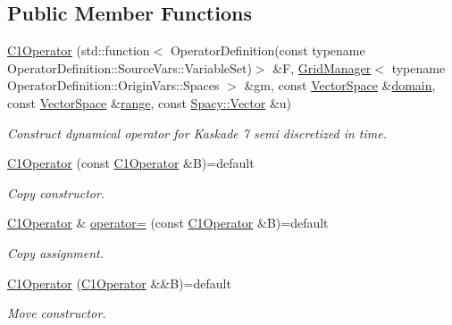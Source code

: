 \subsection*{Public Member Functions}
\begin{DoxyCompactItemize}
\item 
\hyperlink{classSpacy_1_1KaskadeParabolic_1_1C1Operator_aed6a59c7711726f83e95221c54032e98}{C1\-Operator} (std\-::function$<$ Operator\-Definition(const typename Operator\-Definition\-::\-Source\-Vars\-::\-Variable\-Set)$>$ \&F, \hyperlink{classSpacy_1_1KaskadeParabolic_1_1GridManager}{Grid\-Manager}$<$ typename Operator\-Definition\-::\-Origin\-Vars\-::\-Spaces $>$ \&gm, const \hyperlink{classSpacy_1_1VectorSpace}{Vector\-Space} \&\hyperlink{classSpacy_1_1OperatorBase_a2588f9b3e0188820c4c494e63293dc6f}{domain}, const \hyperlink{classSpacy_1_1VectorSpace}{Vector\-Space} \&\hyperlink{classSpacy_1_1OperatorBase_ab19d3b7a6f290b1079248f1e567e53d6}{range}, const \hyperlink{classSpacy_1_1Vector}{Spacy\-::\-Vector} \&u)
\begin{DoxyCompactList}\small\item\em Construct dynamical operator for Kaskade 7 semi discretized in time. \end{DoxyCompactList}\item 
\hyperlink{classSpacy_1_1KaskadeParabolic_1_1C1Operator_ab10ca63c493d51761bcb9e9dd18558d3}{C1\-Operator} (const \hyperlink{classSpacy_1_1KaskadeParabolic_1_1C1Operator}{C1\-Operator} \&B)=default
\begin{DoxyCompactList}\small\item\em Copy constructor. \end{DoxyCompactList}\item 
\hyperlink{classSpacy_1_1KaskadeParabolic_1_1C1Operator}{C1\-Operator} \& \hyperlink{classSpacy_1_1KaskadeParabolic_1_1C1Operator_a2356d1e9b49bad00defde8a47b977fda}{operator=} (const \hyperlink{classSpacy_1_1KaskadeParabolic_1_1C1Operator}{C1\-Operator} \&B)=default
\begin{DoxyCompactList}\small\item\em Copy assignment. \end{DoxyCompactList}\item 
\hyperlink{classSpacy_1_1KaskadeParabolic_1_1C1Operator_a2af1f5c989daa9b053ed49335fd1abb8}{C1\-Operator} (\hyperlink{classSpacy_1_1KaskadeParabolic_1_1C1Operator}{C1\-Operator} \&\&B)=default
\begin{DoxyCompactList}\small\item\em Move constructor. \end{DoxyCompactList}\item 

\end{DoxyCompactItemize}

